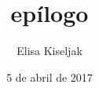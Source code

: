 \documentclass[a5paper,doc,12pt,apacite]{apa}
\title{epílogo}
\author{Elisa Kiseljak}
\affiliation{Tres historias europeas}
\date{5 de abril de 2017}
\begin{document}
 \maketitle
 

\nocite{Bosch}


\end{document}

